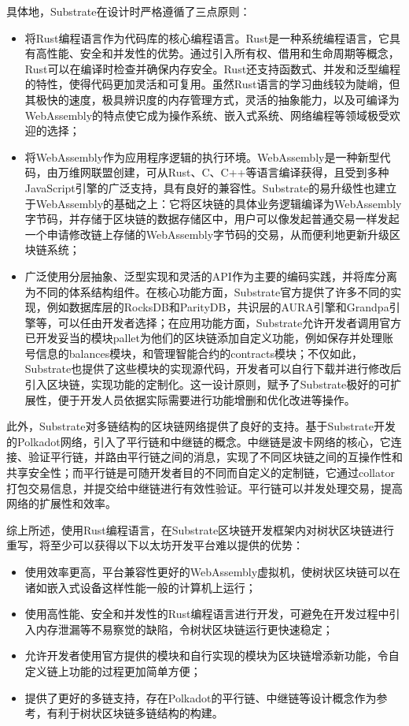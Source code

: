 具体地，Substrate在设计时严格遵循了三点原则：

\begin{itemize}
    \item 将Rust编程语言作为代码库的核心编程语言。Rust是一种系统编程语言，它具有高性能、安全和并发性的优势。通过引入所有权、借用和生命周期等概念，Rust可以在编译时检查并确保内存安全。Rust还支持函数式、并发和泛型编程的特性，使得代码更加灵活和可复用。虽然Rust语言的学习曲线较为陡峭，但其极快的速度，极具辨识度的内存管理方式，灵活的抽象能力，以及可编译为WebAssembly的特点使它成为操作系统、嵌入式系统、网络编程等领域极受欢迎的选择；
    \item 将WebAssembly作为应用程序逻辑的执行环境。WebAssembly是一种新型代码，由万维网联盟创建，可从Rust、C、C++等语言编译获得，且受到多种JavaScript引擎的广泛支持，具有良好的兼容性\cite{wasmIntro}。Substrate的易升级性也建立于WebAssembly的基础之上：它将区块链的具体业务逻辑编译为WebAssembly字节码，并存储于区块链的数据存储区中，用户可以像发起普通交易一样发起一个申请修改链上存储的WebAssembly字节码的交易，从而便利地更新升级区块链系统；
    \item 广泛使用分层抽象、泛型实现和灵活的API作为主要的编码实践，并将库分离为不同的体系结构组件。在核心功能方面，Substrate官方提供了许多不同的实现，例如数据库层的RocksDB和ParityDB，共识层的AURA引擎和Grandpa引擎等，可以任由开发者选择；在应用功能方面，Substrate允许开发者调用官方已开发妥当的模块pallet为他们的区块链添加自定义功能，例如保存并处理账号信息的balances模块，和管理智能合约的contracts模块；不仅如此，Substrate也提供了这些模块的实现源代码，开发者可以自行下载并进行修改后引入区块链，实现功能的定制化。这一设计原则，赋予了Substrate极好的可扩展性，便于开发人员依据实际需要进行功能增删和优化改进等操作。
\end{itemize}

此外，Substrate对多链结构的区块链网络提供了良好的支持。基于Substrate开发的Polkadot网络，引入了平行链和中继链的概念。中继链是波卡网络的核心，它连接、验证平行链，并路由平行链之间的消息，实现了不同区块链之间的互操作性和共享安全性；而平行链是可随开发者目的不同而自定义的定制链，它通过collator打包交易信息，并提交给中继链进行有效性验证。平行链可以并发处理交易，提高网络的扩展性和效率。

综上所述，使用Rust编程语言，在Substrate区块链开发框架内对树状区块链进行重写，将至少可以获得以下以太坊开发平台难以提供的优势：

\begin{itemize}
    \item 使用效率更高，平台兼容性更好的WebAssembly虚拟机，使树状区块链可以在诸如嵌入式设备这样性能一般的计算机上运行；
    \item 使用高性能、安全和并发性的Rust编程语言进行开发，可避免在开发过程中引入内存泄漏等不易察觉的缺陷，令树状区块链运行更快速稳定；
    \item 允许开发者使用官方提供的模块和自行实现的模块为区块链增添新功能，令自定义链上功能的过程更加简单方便；
    \item 提供了更好的多链支持，存在Polkadot的平行链、中继链等设计概念作为参考，有利于树状区块链多链结构的构建。
\end{itemize}

